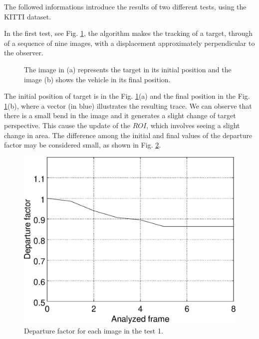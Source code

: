 The followed informations introduce the results of two different tests, 
using the KITTI dataset\cite{Geiger}.


In the first test, see Fig. \ref{fig:imgpapercerta}, 
the algorithm makes the tracking of a target, through of a sequence of nine images, with 
a displacement approximately perpendicular to the observer.
\begin{figure}[!hbt]
\centering
  \caption{The image in (a) represents the target in its initial position 
   and the image (b) shows the vehicle in its final position.}
  \label{fig:imgpapercerta}
\end{figure}
The initial position of target is in the Fig. \ref{fig:imgpapercerta}(a) 
and the final position in the Fig. \ref{fig:imgpapercerta}(b), 
where a vector (in blue) illustrates the resulting trace.
We can observe that there is a small bend in the image 
and it generates a slight change of target perspective. 
This cause the update of the $ROI$, which involves seeing a slight change in area.
The difference among the initial and final values of the departure factor may 
be considered small, as shown in Fig. \ref{fig:res_graph1}.
\begin{figure}[!hbt]
\centering
\includegraphics[width=0.8\columnwidth]{images/graph1.eps}
\caption{Departure factor for each image in the test 1.}
\label{fig:res_graph1}
\end{figure}
